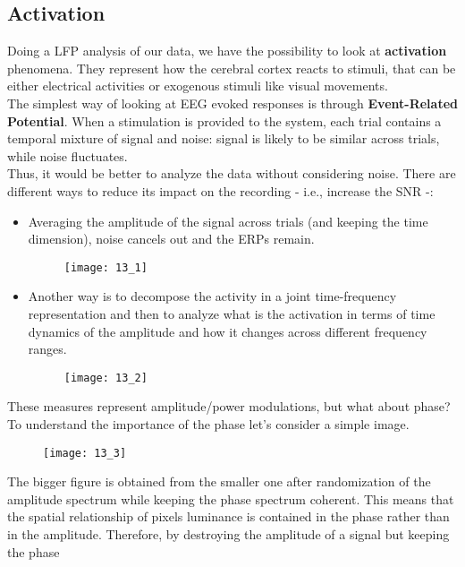 \subsection{Activation}
Doing a LFP analysis of our data, we have the possibility to look at
\textbf{activation} phenomena. They represent how the cerebral cortex reacts to
stimuli, that can be either electrical activities or exogenous stimuli like visual
movements.\\
The simplest way of looking at EEG evoked responses is through \textbf{Event-Related
    Potential}. When a stimulation is provided to the system, each trial contains a
temporal mixture of signal and noise: signal is likely to be similar across trials,
while noise fluctuates.\\
Thus, it would be better to analyze the data without considering noise. There are
different ways to reduce its impact on the recording - i.e., increase the SNR -:
\begin{itemize}
    \item Averaging the amplitude of the signal across trials (and keeping the time
          dimension), noise cancels out and the ERPs remain.
          \begin{figure}[H]
              \centering
              \texttt{[image: 13\_1]}
          \end{figure}
    \item Another way is to decompose the activity in a joint time-frequency
          representation and then to analyze what is the activation in terms of
          time dynamics of the amplitude and how it changes across different frequency
          ranges.
          \begin{figure}[H]
              \centering
              \texttt{[image: 13\_2]}
          \end{figure}
\end{itemize}
These measures represent amplitude/power modulations, but what about phase? To
understand the importance of the phase let's consider a simple image.
\begin{figure}[H]
    \centering
    \texttt{[image: 13\_3]}
\end{figure}
The bigger figure is obtained from the smaller one after randomization of the amplitude
spectrum while keeping the phase spectrum coherent. This means that the spatial
relationship of pixels luminance is contained in the phase rather than in the
amplitude. Therefore, by destroying the amplitude of a signal but keeping the phase
